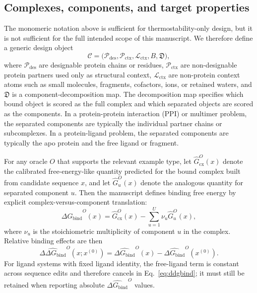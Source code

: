\documentclass[11pt]{article}
\newcommand{\ddGbind}{\ensuremath{\Delta\Delta G_{\mathrm{bind}}}}
\newcommand{\dGbind}{\ensuremath{\Delta G_{\mathrm{bind}}}}
\newcommand{\Cx}{\mathcal{C}}
\begin{document}
\subsection{Complexes, components, and target properties}

The monomeric notation above is sufficient for thermostability-only design, but it is not sufficient for the full intended scope of this manuscript. We therefore define a generic design object
\begin{equation}
    \Cx = \big(\mathcal{P}_{\mathrm{des}},\mathcal{P}_{\mathrm{ctx}},\mathcal{L}_{\mathrm{ctx}},B,\mathfrak{D}\big),
\end{equation}
where $\mathcal{P}_{\mathrm{des}}$ are designable protein chains or residues, $\mathcal{P}_{\mathrm{ctx}}$ are non-designable protein partners used only as structural context, $\mathcal{L}_{\mathrm{ctx}}$ are non-protein context atoms such as small molecules, fragments, cofactors, ions, or retained waters, and $\mathfrak{D}$ is a component-decomposition map. The decomposition map specifies which bound object is scored as the full complex and which separated objects are scored as the components. In a protein-protein interaction (PPI) or multimer problem, the separated components are typically the individual partner chains or subcomplexes. In a protein-ligand problem, the separated components are typically the apo protein and the free ligand or fragment.

For any oracle $O$ that supports the relevant example type, let $\widehat G^{O}_{\mathrm{cx}}(x)$ denote the calibrated free-energy-like quantity predicted for the bound complex built from candidate sequence $x$, and let $\widehat G^{O}_{u}(x)$ denote the analogous quantity for separated component $u$. Then the manuscript defines binding free energy by explicit complex-versus-component translation:
\begin{equation}
\label{eq:dgbind}
    \widehat{\dGbind}^{O}(x)=\widehat G^{O}_{\mathrm{cx}}(x)-\sum_{u=1}^{U}\nu_u\widehat G^{O}_{u}(x),
\end{equation}
where $\nu_u$ is the stoichiometric multiplicity of component $u$ in the complex. Relative binding effects are then
\begin{equation}
\label{eq:ddgbind}
    \widehat{\ddGbind}^{O}(x;x^{(0)})=\widehat{\dGbind}^{O}(x)-\widehat{\dGbind}^{O}(x^{(0)}).
\end{equation}
For ligand systems with fixed ligand identity, the free-ligand term is constant across sequence edits and therefore cancels in Eq.~\eqref{eq:ddgbind}; it must still be retained when reporting absolute $\widehat{\dGbind}^{O}$ values.
\end{document}
